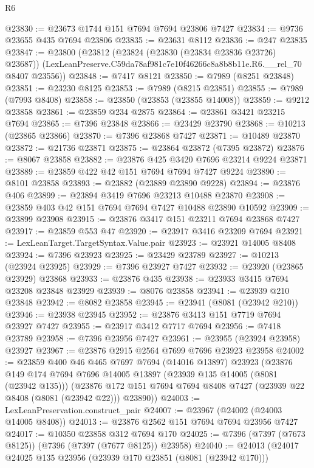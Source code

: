 \begin{lexlean}{R6}
\begin{coremodule}
@23830 := @23673 @1744 @151 @7694 @7694 @23806 @7427
@23834 := @9736 @23655 @435 @7694 @23806
@23835 := @23631 @8112
@23836 := @247 @23835
@23847 := @23800
    (@23812
      (@23824 (@23830 (@23834 @23836 @23726) @23687))
      (LexLeanPreserve.C59da78af981c7e10f46266c8a8b8b11e.R6.__rel_70 @8407 @23556))
@23848 := @7417 @8121
@23850 := @7989 (@8251 @23848)
@23851 := @23230 @8125
@23853 := @7989 (@8215 @23851)
@23855 := @7989 (@7993 @8408)
@23858 := @23850 (@23853 (@23855 @14008))
@23859 := @9212 @23858
@23861 := @23859 @234 @2875
@23864 := @23861 @3421 @23215 @7694
@23865 := @7396 @23848
@23866 := @23429 @23790
@23868 := @10213 (@23865 @23866)
@23870 := @7396 @23868 @7427
@23871 := @10489 @23870
@23872 := @21736 @23871
@23875 := @23864 @23872 (@7395 @23872)
@23876 := @8067 @23858
@23882 := @23876 @425 @3420 @7696 @23214 @9224 @23871
@23889 := @23859 @422 @42 @151 @7694 @7694 @7427 @9224
@23890 := @8101 @23858
@23893 := @23882 (@23889 @23890 @9228)
@23894 := @23876 @406
@23899 := @23894 @3419 @7696 @23213 @10488 @23870
@23908 := @23859 @403 @42 @151 @7694 @7694 @7427 @10488 @23890 @10592
@23909 := @23899 @23908
@23915 := @23876 @3417 @151 @23211 @7694 @23868 @7427
@23917 := @23859 @553 @47
@23920 := @23917 @3416 @23209 @7694
@23921 := LexLeanTarget.TargetSyntax.Value.pair
@23923 := @23921 @14005 @8408
@23924 := @7396 @23923
@23925 := @23429 @23789
@23927 := @10213 (@23924 @23925)
@23929 := @7396 @23927 @7427
@23932 := @23920 (@23865 @23929) @23868
@23933 := @23876 @435
@23938 := @23933 @3415 @7694 @23208 @23848 @23929
@23939 := @8076 @23858
@23941 := @23939 @210 @23848
@23942 := @8082 @23858
@23945 := @23941 (@8081 (@23942 @210))
@23946 := @23938 @23945
@23952 := @23876 @3413 @151 @7719 @7694 @23927 @7427
@23955 := @23917 @3412 @7717 @7694
@23956 := @7418 @23789
@23958 := @7396 @23956 @7427
@23961 := @23955 (@23924 @23958) @23927
@23967 := @23876 @2915 @2564 @7699 @7696 @23923 @23958
@24002 := @23859
    @400
    @46
    @465
    @7697
    @7694
    (@14016 @13897)
    @23923
    (@23876
      @149
      @174
      @7694
      @7696
      @14005
      @13897
      (@23939 @135 @14005 (@8081 (@23942 @135)))
      (@23876 @172 @151 @7694 @7694 @8408 @7427 (@23939 @22 @8408 (@8081 (@23942 @22))) @23890))
@24003 := LexLeanPreservation.construct_pair
@24007 := @23967 (@24002 (@24003 @14005 @8408))
@24013 := @23876 @2562 @151 @7694 @7694 @23956 @7427
@24017 := @10350 @23858 @312 @7694 @170
@24025 := @7396 (@7397 (@7673 @8125)) (@7396 (@7397 (@7677 @8125)) @23958)
@24040 := @24013
    (@24017
      @24025
      @135
      @23956
      (@23939 @170 @23851 (@8081 (@23942 @170)))

\end{coremodule}
\end{lexlean}
